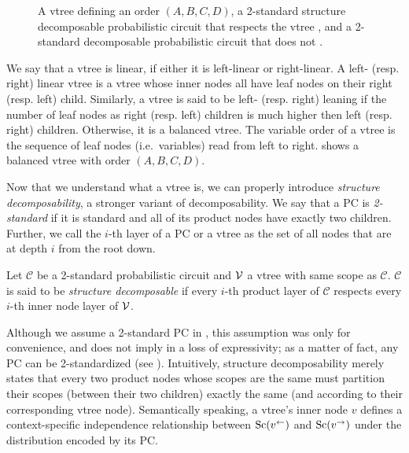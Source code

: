 \begin{figure}[t]
\begin{subfigure}[t]{0.35\textwidth}
{
    }
    \caption{}
    \label{fig:norespect}
  \end{subfigure}
  \caption{A vtree  defining an order $(A,B,C,D)$, a 2-standard structure
    decomposable probabilistic circuit that respects the vtree , and a 2-standard
    decomposable probabilistic circuit that does not .}
  \label{fig:vtreeresp}
\end{figure}

We say that a vtree is linear, if either it is left-linear or right-linear. A left- (resp. right)
linear vtree is a vtree whose inner nodes all have leaf nodes on their right (resp. left) child.
Similarly, a vtree is said to be left- (resp. right) leaning if the number of leaf nodes as right
(resp. left) children is much higher then left (resp. right) children. Otherwise, it is a balanced
vtree. The variable order of a vtree is the sequence of leaf nodes (i.e.\ variables) read from left
to right.  shows a balanced vtree with order $(A,B,C,D)$.

Now that we understand what a vtree is, we can properly introduce \emph{structure decomposability},
a stronger variant of decomposability. We say that a PC is \emph{2-standard} if it is standard and
all of its product nodes have exactly two children. Further, we call the $i$-th layer of a PC or a
vtree as the set of all nodes that are at depth $i$ from the root down.

\begin{definition}
  \label{def:sdec}%
  Let $\mathcal{C}$ be a 2-standard probabilistic circuit and $\operatorname{\mathcal{V}}$ a vtree with same scope as
  $\mathcal{C}$. $\mathcal{C}$ is said to be \emph{structure decomposable} if every $i$-th product
  layer of $\mathcal{C}$ respects every $i$-th inner node layer of $\operatorname{\mathcal{V}}$.
\end{definition}

Although we assume a 2-standard PC in , this assumption was only for convenience,
and does not imply in a loss of expressivity; as a matter of fact, any PC can be 2-standardized
(see ). Intuitively, structure decomposability merely states that every two
product nodes whose scopes are the same must partition their scopes (between their two children)
exactly the same (and according to their corresponding vtree node). Semantically speaking, a
vtree's inner node $v$ defines a context-specific independence relationship between $\operatorname*{\normalfont{Sc}}(v^\gets)$
and $\operatorname*{\normalfont{Sc}}(v^\to)$ under the distribution encoded by its PC.

